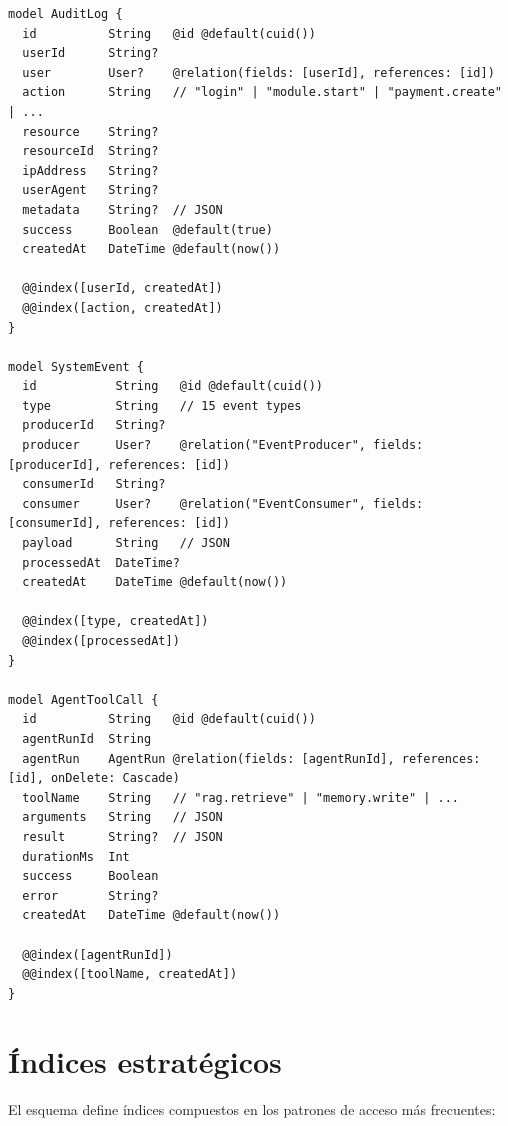 \documentclass[10pt,a4paper,oneside]{report}
\begin{document}
\begin{lstlisting}[style=sql,caption={Modelos de auditoría}]
model AuditLog {
  id          String   @id @default(cuid())
  userId      String?
  user        User?    @relation(fields: [userId], references: [id])
  action      String   // "login" | "module.start" | "payment.create" | ...
  resource    String?
  resourceId  String?
  ipAddress   String?
  userAgent   String?
  metadata    String?  // JSON
  success     Boolean  @default(true)
  createdAt   DateTime @default(now())

  @@index([userId, createdAt])
  @@index([action, createdAt])
}

model SystemEvent {
  id           String   @id @default(cuid())
  type         String   // 15 event types
  producerId   String?
  producer     User?    @relation("EventProducer", fields: [producerId], references: [id])
  consumerId   String?
  consumer     User?    @relation("EventConsumer", fields: [consumerId], references: [id])
  payload      String   // JSON
  processedAt  DateTime?
  createdAt    DateTime @default(now())

  @@index([type, createdAt])
  @@index([processedAt])
}

model AgentToolCall {
  id          String   @id @default(cuid())
  agentRunId  String
  agentRun    AgentRun @relation(fields: [agentRunId], references: [id], onDelete: Cascade)
  toolName    String   // "rag.retrieve" | "memory.write" | ...
  arguments   String   // JSON
  result      String?  // JSON
  durationMs  Int
  success     Boolean
  error       String?
  createdAt   DateTime @default(now())

  @@index([agentRunId])
  @@index([toolName, createdAt])
}
\end{lstlisting}

\section{Índices estratégicos}
El esquema define índices compuestos en los patrones de acceso más frecuentes:
\end{document}
